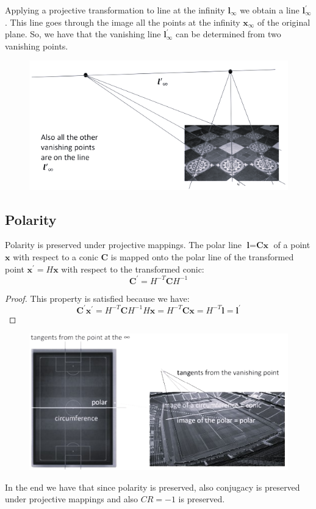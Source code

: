 \documentclass[12pt, a4paper]{report}
\newtheorem[style=M,bodystyle=\normalfont]{theorem}{Theorem}
\newtheorem[style=M,bodystyle=\normalfont]{corollary}{Corollary}
\newtheorem[style=M,bodystyle=\normalfont]{lemma}{Lemma}
\newtheorem[style=M,bodystyle=\normalfont]{definition}{Definition}
\begin{document}
    Applying a projective transformation to line at the infinity $\textbf{l}_{\infty}$ we obtain a line $\textbf{l}_{\infty}^{'}$. This line goes through the image all the points at 
    the infinity $\textbf{x}_{\infty}$ of the original plane. So, we have that the vanishing line $\textbf{l}_{\infty}^{'}$ can be determined from two vanishing points. 
    \begin{figure}[H]
        \centering
        \includegraphics[width=0.75\linewidth]{images/vanishingline.png}
    \end{figure}

    \subsection{Polarity}
    Polarity is preserved under projective mappings. The polar line $\textbf{l}=\textbf{Cx}$ of a point $\textbf{x}$ with respect to a conic $\textbf{C}$ is mapped onto the polar line 
    of the transformed point $\textbf{x}^{'}=H\textbf{x}$ with respect to the transformed conic: 
    \[\textbf{C}^{'}=H^{-T}\textbf{C}H^{-1}\]
    \begin{proof}
        This property is satisfied because we have: 
        \[\textbf{C}^{'}\textbf{x}^{'}=H^{-T}\textbf{C}H^{-1}H\textbf{x}=H^{-T}\textbf{Cx}=H^{-T}\textbf{l}=\textbf{l}^{'}\]
    \end{proof}
    \begin{figure}[H]
        \centering
        \includegraphics[width=0.75\linewidth]{images/polarity.png}
    \end{figure}
    In the end we have that since polarity is preserved, also conjugacy is preserved under projective mappings and also $CR=-1$ is preserved.
\end{document}
